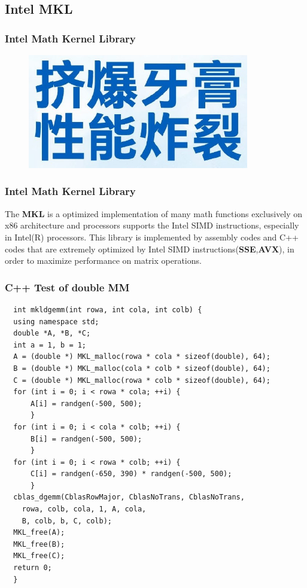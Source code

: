 \documentclass[cjk]{beamer}
\begin{document}
\subsection{Intel MKL}
\begin{frame}
  \frametitle{Intel Math Kernel Library}

  \begin{figure}[htb]
    \begin{center}
      \includegraphics[height=5.0cm]{yagao-logo.jpg}
    \end{center}
  \end{figure}

\end{frame}
\begin{frame}
  \frametitle{Intel Math Kernel Library}

  The \textbf{MKL} is a optimized implementation of many math functions exclusively on x86 architecture and processors supports the Intel SIMD instructions, especially in Intel(R) processors. This library is implemented by assembly codes and C++ codes that are extremely optimized by Intel SIMD instructions(\textbf{SSE},\textbf{AVX}), in order to maximize performance on matrix operations.
\end{frame}
\begin{frame}[fragile]
  \frametitle{C++ Test of double MM}

  \begin{lstlisting}
  int mkldgemm(int rowa, int cola, int colb) {
  using namespace std;
  double *A, *B, *C;
  int a = 1, b = 1;
  A = (double *) MKL_malloc(rowa * cola * sizeof(double), 64);
  B = (double *) MKL_malloc(cola * colb * sizeof(double), 64);
  C = (double *) MKL_malloc(rowa * colb * sizeof(double), 64);
  for (int i = 0; i < rowa * cola; ++i) {
      A[i] = randgen(-500, 500);
      }
  for (int i = 0; i < cola * colb; ++i) {
      B[i] = randgen(-500, 500);
      }
  for (int i = 0; i < rowa * colb; ++i) {
      C[i] = randgen(-650, 390) * randgen(-500, 500);
      }
  cblas_dgemm(CblasRowMajor, CblasNoTrans, CblasNoTrans,
    rowa, colb, cola, 1, A, cola,
    B, colb, b, C, colb);
  MKL_free(A);
  MKL_free(B);
  MKL_free(C);
  return 0;
  }
\end{lstlisting}

\end{frame}
\end{document}
